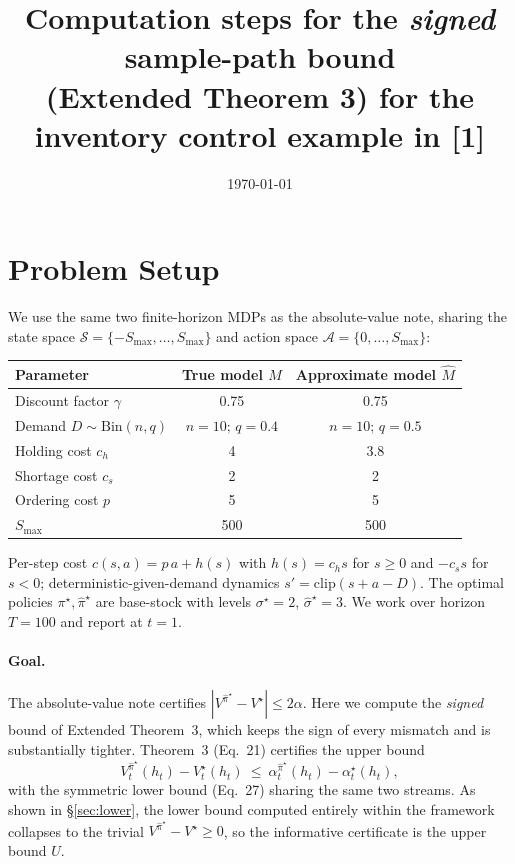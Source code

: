 \documentclass[11pt]{article}
\title{Computation steps for the \emph{signed} sample-path bound\\
(Extended Theorem 3) for the inventory control example in [1]}
\date{\today}
\newcommand{\Smax}{S_{\max}}
\newcommand{\pihat}{\hat\pi}
\begin{document}
\maketitle

\section{Problem Setup}
We use the same two finite-horizon MDPs as the absolute-value note, sharing the
state space $\mathcal S=\{-\Smax,\dots,\Smax\}$ and action space
$\mathcal A=\{0,\dots,\Smax\}$:

\begin{center}
\begin{tabular}{lcc}
\toprule
Parameter & True model $M$ & Approximate model $\hat M$\\
\midrule
Discount factor $\gamma$ & 0.75 & 0.75\\
Demand $D\sim\mathrm{Bin}(n,q)$ & $n=10;\,q=0.4$ & $n=10;\,q=0.5$\\
Holding cost $c_h$ & 4 & 3.8\\
Shortage cost $c_s$ & 2 & 2\\
Ordering cost $p$ & 5 & 5\\
$\Smax$ & 500 & 500\\
\bottomrule
\end{tabular}
\end{center}

Per-step cost $c(s,a)=p\,a+h(s)$ with $h(s)=c_h s$ for $s\ge 0$ and $-c_s s$ for
$s<0$; deterministic-given-demand dynamics $s'=\mathrm{clip}(s+a-D)$. The optimal
policies $\pi^\star,\pihat^\star$ are base-stock with levels $\sigma^\star=2$,
$\hat\sigma^\star=3$. We work over horizon $T=100$ and report at $t=1$.

\paragraph{Goal.}
The absolute-value note certifies $|V^{\pihat^\star}-V^\star|\le 2\alpha$. Here we
compute the \emph{signed} bound of Extended Theorem~3, which keeps the sign of
every mismatch and is substantially tighter. Theorem~3 (Eq.~21) certifies the
upper bound
\begin{equation}
V^{\pihat^\star}_t(h_t)-V^\star_t(h_t)\ \le\
\alpha^{\pihat^\star}_t(h_t)-\alpha^{\star}_t(h_t),
\label{eq:goal}
\end{equation}
with the symmetric lower bound (Eq.~27) sharing the same two streams. As shown in
\S\ref{sec:lower}, the lower bound computed entirely within the framework
collapses to the trivial $V^{\pihat^\star}-V^\star\ge 0$, so the informative
certificate is the upper bound $U$.
\end{document}
